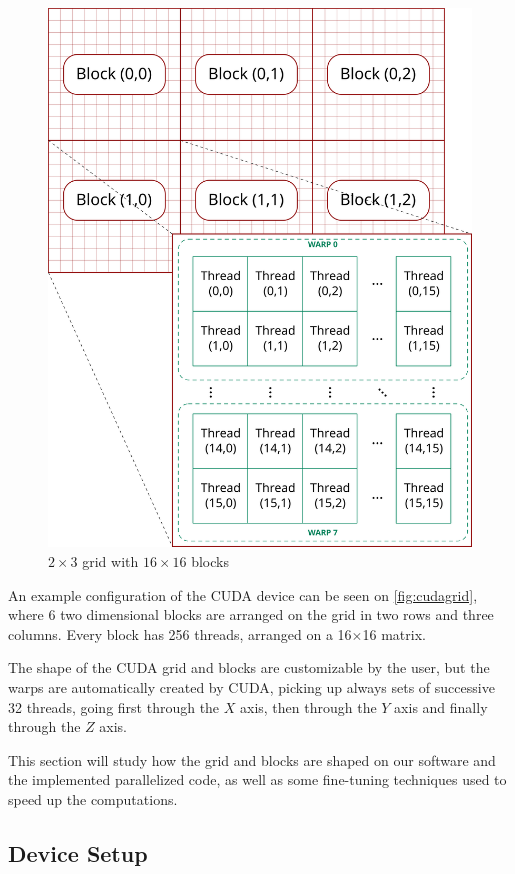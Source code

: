 \begin{figure}[bth]
	\myfloatalign
	\includegraphics[width=.8\linewidth]{gfx/cudagrid.png}
	\caption[$2\times3$ grid with $16\times16$ blocks]{$2\times3$ grid with $16\times16$ blocks}
	\label{fig:cudagrid}
\end{figure}

An example configuration of the \ac{CUDA} device can be seen on \autoref{fig:cudagrid}, where 6 two dimensional blocks are arranged on the grid in two rows and three columns. Every block has 256 threads, arranged on a 16$\times$16 matrix.

The shape of the \ac{CUDA} grid and blocks are customizable by the user, but the warps are automatically created by \ac{CUDA}, picking up always sets of successive 32 threads, going first through the $X$ axis, then through the $Y$ axis and finally through the $Z$ axis.

This section will study how the grid and blocks are shaped on our software and the implemented parallelized code, as well as some fine-tuning techniques used to speed up the computations.

\subsection{Device Setup}

